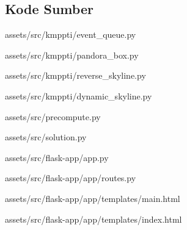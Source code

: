 \begin{appendices}

\chapter{Kode Sumber}
	\setcounter{figure}{0}
	\renewcommand{\thetable}{A.\arabic{table}}
	\renewcommand{\thefigure}{A.\arabic{figure}}

	 {assets/src/kmppti/event_queue.py}
  
	 {assets/src/kmppti/pandora_box.py}
  
	 {assets/src/kmppti/reverse_skyline.py}
	
	 {assets/src/kmppti/dynamic_skyline.py}
  
	 {assets/src/precompute.py}
	
	 {assets/src/solution.py}
	
	 {assets/src/flask-app/app.py}
	
	 {assets/src/flask-app/app/routes.py}
	
	 {assets/src/flask-app/app/templates/main.html}
	
	 {assets/src/flask-app/app/templates/index.html}	
	

\end{appendices}
